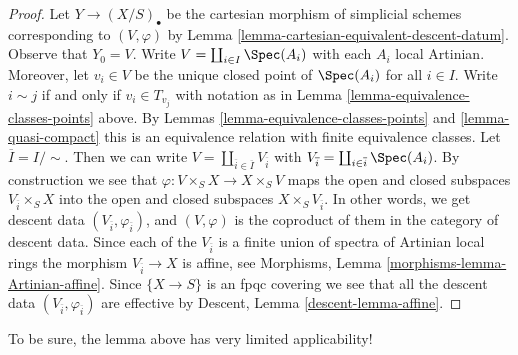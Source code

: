 \begin{proof}
Let $Y \to (X/S)_\bullet$ be the cartesian morphism of simplicial
schemes corresponding to $(V, \varphi)$ by
Lemma \ref{lemma-cartesian-equivalent-descent-datum}.
Observe that $Y_0 = V$.
Write $V = \coprod_{i \in I} \Spec(A_i)$ with each $A_i$ local
Artinian. Moreover, let $v_i \in V$ be the unique closed point of
$\Spec(A_i)$ for all $i \in I$. Write $i \sim j$ if and only if
$v_i \in T_{v_j}$ with notation as in
Lemma \ref{lemma-equivalence-classes-points} above.
By Lemmas \ref{lemma-equivalence-classes-points} and \ref{lemma-quasi-compact}
this is an equivalence relation with finite equivalence
classes. Let $\overline{I} = I/\sim$. Then we can write
$V = \coprod_{\overline{i} \in \overline{I}} V_{\overline{i}}$
with
$V_{\overline{i}} = \coprod_{i \in \overline{i}} \Spec(A_i)$.
By construction we see that
$\varphi : V \times_S X \to X \times_S V$ maps
the open and closed subspaces $V_{\overline{i}} \times_S X$
into the open and closed subspaces $X \times_S V_{\overline{i}}$.
In other words, we get descent data
$(V_{\overline{i}}, \varphi_{\overline{i}})$, and
$(V, \varphi)$ is the coproduct of them in the category of
descent data.
Since each of the $V_{\overline{i}}$ is a finite union of
spectra of Artinian local rings the morphism $V_{\overline{i}} \to X$
is affine, see Morphisms, Lemma \ref{morphisms-lemma-Artinian-affine}.
Since $\{X \to S\}$ is an fpqc covering we see that all
the descent data $(V_{\overline{i}}, \varphi_{\overline{i}})$ are effective
by Descent, Lemma \ref{descent-lemma-affine}.
\end{proof}

\noindent
To be sure, the lemma above has very limited applicability!











